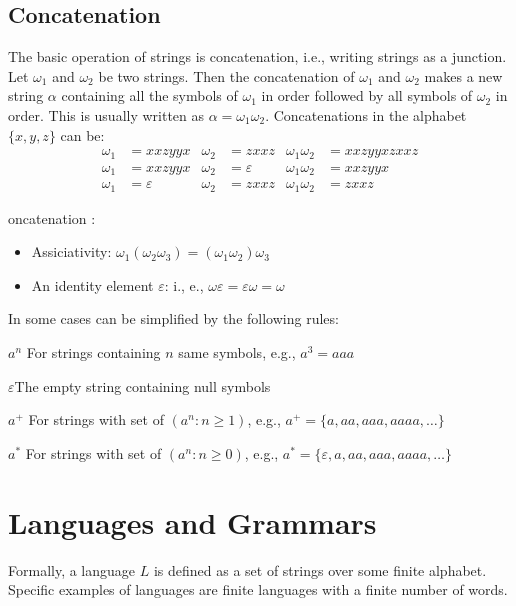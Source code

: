 \subsection{Concatenation}
The basic operation of strings is concatenation, i.e., writing strings as a junction. Let $\omega_1$ and $\omega_2$ be two strings. Then the concatenation of $\omega_1$ and $\omega_2$ makes a new string $\alpha$ containing all the symbols of $\omega_1$ in order followed by all symbols of $\omega_2$ in order. This is usually written as $\alpha=\omega_1\omega_2$.
Concatenations in the alphabet $\{x, y, z\}$ can be:
\begin{align*}
\omega_1&=xxzyyx	& \omega_2&=zxxz	& \omega_1\omega_2&=xxzyyxzxxz\\
\omega_1&=xxzyyx	& \omega_2&=\varepsilon	& \omega_1\omega_2&=xxzyyx\\
\omega_1&=\varepsilon	& \omega_2&=zxxz	& \omega_1\omega_2&=zxxz
\end{align*}

oncatenation :

\begin{itemize}
	\item Assiciativity: $\omega_1(\omega_2\omega_3)=(\omega_1\omega_2)\omega_3$
	\item An identity element $\varepsilon$: i., e., $\omega\varepsilon = \varepsilon\omega = \omega$
\end{itemize}

In some cases  can be simplified by the following rules: 

$a^n$ \qquad For strings containing $n$ same symbols, e.g., $a^3=aaa$

$\varepsilon$\qquad\quad The empty string containing null symbols

$a^+$ \qquad For strings with set of $(a^n:n\geq1)$, e.g., $a^+=\{a, aa, aaa, aaaa, \ldots\}$

$a^*$ \qquad For strings with set of $(a^n:n\geq0)$, e.g., $a^*=\{\varepsilon, a, aa, aaa, aaaa, \ldots\}$
 
\section{Languages and Grammars}
Formally, a language $L$ is defined as a set of strings over some finite alphabet. Specific examples of languages are finite languages with a finite number of words.

